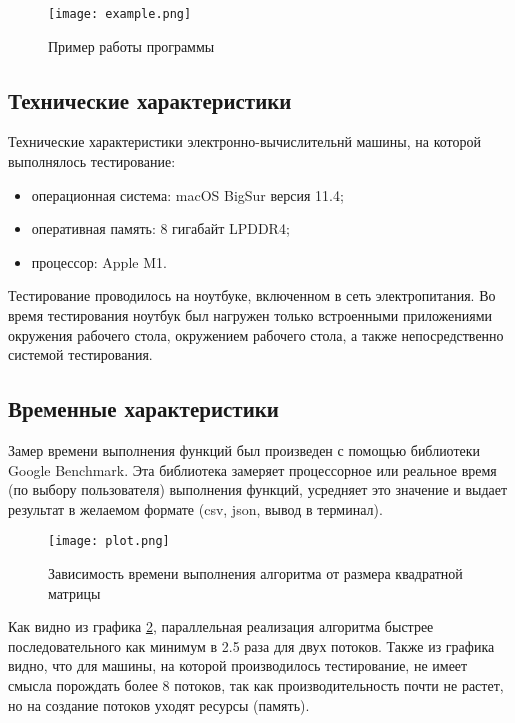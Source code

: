 \begin{figure}[H]
    \centering
    \texttt{[image: example.png]}
    \caption{Пример работы программы}
    \label{img:example}
\end{figure}

\subsection{Технические характеристики}

Технические характеристики электронно-вычислительнй машины, на которой выполнялось тестирование:

\begin{itemize}
    \item операционная система: macOS BigSur версия 11.4;
    \item оперативная память: 8 гигабайт LPDDR4;
    \item процессор: Apple M1.
\end{itemize}


Тестирование проводилось на ноутбуке, включенном в сеть электропитания. Во время тестирования ноутбук был нагружен только встроенными приложениями окружения рабочего стола, окружением рабочего стола, а также непосредственно системой тестирования.

\subsection{Временные характеристики}

Замер времени выполнения функций был произведен с помощью библиотеки Google Benchmark. Эта библиотека замеряет процессорное или реальное время (по выбору пользователя) выполнения функций, усредняет это значение и выдает результат в желаемом формате (csv, json, вывод в терминал).

\begin{figure}[H]
    \centering
    \texttt{[image: plot.png]}
    \caption{Зависимость времени выполнения алгоритма от размера квадратной матрицы}
    \label{img:benchmark}
\end{figure}

Как видно из графика \ref{img:benchmark}, параллельная реализация алгоритма быстрее последовательного как минимум в 2.5 раза для двух потоков. Также из графика видно, что для машины, на которой производилось тестирование, не имеет смысла порождать более 8 потоков, так как производительность почти не растет, но на создание потоков уходят ресурсы (память).

